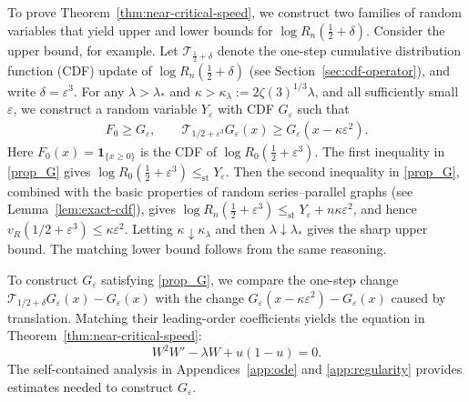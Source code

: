 \documentclass[12pt]{amsart}
\numberwithin{equation}{section}
\theoremstyle{plain}
\theoremstyle{definition}
\newcommand{\stle}{\le_{\mathrm{st}}}
\begin{document}
To prove Theorem~\ref{thm:near-critical-speed}, we construct two families of random variables that yield upper and lower bounds for $\log R_n(\frac12+\delta)$. Consider the upper bound, for example. Let $\mathcal T_{\frac12+\delta}$ denote the one-step cumulative distribution function (CDF)
update of $\log R_n(\frac12+\delta)$ (see Section~\ref{sec:cdf-operator}), and write $\delta=\varepsilon^3$. For any
\(\lambda>\lambda_*\) and
\(\kappa>\kappa_\lambda:=2\zeta(3)^{1/3}\lambda\), and all sufficiently
small \(\varepsilon\), we construct a random variable
\(Y_\varepsilon\) with CDF \(G_\varepsilon\) such that
\begin{align}\label{prop_G}
 F_0\ge G_\varepsilon,
 \qquad
 \mathcal T_{1/2+\varepsilon^3}G_\varepsilon(x)
 \ge G_\varepsilon(x-\kappa\varepsilon^2).
\end{align}
Here $F_0(x)=\mathbf 1_{\{x\ge0\}}$ is the CDF of $\log R_0(\frac12+\varepsilon^3)$. The first inequality in \eqref{prop_G} gives $\log R_0(\frac12+\varepsilon^3)
 \stle Y_\varepsilon$. Then the second inequality in \eqref{prop_G}, combined with the basic properties of random series--parallel graphs (see Lemma~\ref{lem:exact-cdf}), gives
  $\log R_n(\frac12+\varepsilon^3)
 \stle Y_\varepsilon+n\kappa\varepsilon^2$, and hence
\(v_R(1/2+\varepsilon^3)\le\kappa\varepsilon^2\).
Letting \(\kappa\downarrow\kappa_\lambda\) and then
\(\lambda\downarrow\lambda_*\) gives the sharp upper bound. The matching
lower bound follows from the same reasoning.

To construct \(G_\varepsilon\) satisfying \eqref{prop_G}, we compare the  one-step change
\(\mathcal T_{1/2+\delta}G_\varepsilon(x)-G_\varepsilon(x)\) with the change
\(G_\varepsilon(x-\kappa\varepsilon^2)-G_\varepsilon(x)\) caused by translation.
 Matching their leading-order coefficients yields the
equation in Theorem~\ref{thm:near-critical-speed}:
\[
 W^2W'-\lambda W+u(1-u)=0.
\]
The self-contained analysis in Appendices~\ref{app:ode} and
\ref{app:regularity} provides estimates
needed to construct \(G_\varepsilon\).
\end{document}
